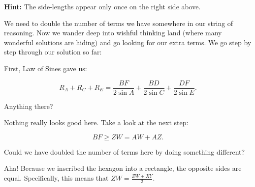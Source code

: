 \vspace{6pt}
\textbf{Hint:} The side-lengths appear only once on the right side above.



We need to double the number of terms we have somewhere in our string of reasoning.  Now we wander deep into wishful thinking land (where many wonderful solutions are hiding) and go looking for our extra terms.  We go step by step through our solution so far:

First, Law of Sines gave us:

$$R_A + R_C + R_E = \frac{BF}{2\sin A} + \frac{BD}{2 \sin C} + \frac{DF}{2 \sin E}.$$

Anything there?


Nothing really looks good here.  Take a look at the next step:

$$BF \ge ZW = AW + AZ.$$

Could we have doubled the number of terms here by doing something different?





Aha! Because we inscribed the hexagon into a rectangle, the opposite sides are equal. Specifically, this means that $ZW = \frac{ZW + XY}{2}.$


